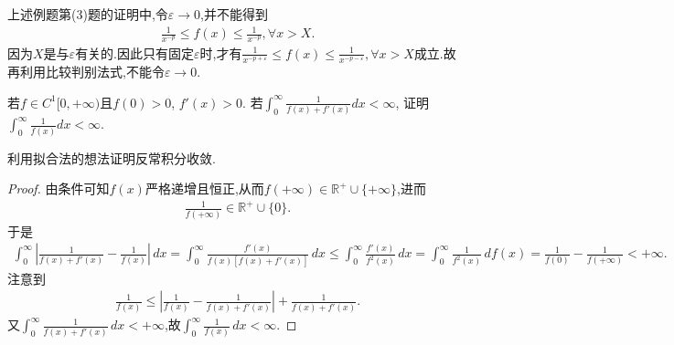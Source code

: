 \documentclass[../../main.tex]{subfiles}
\begin{document}
\begin{remark}
上述例题第(3)题的证明中,令$\varepsilon \to 0$,并不能得到
\begin{align*}
\frac{1}{x^{-p}}\leqslant f(x)\leqslant \frac{1}{x^{-p}},\forall x>X.
\end{align*}
因为$X$是与$\varepsilon$有关的.因此只有固定$\varepsilon$时,才有$\frac{1}{x^{-p+\varepsilon}}\leqslant f\left( x \right) \leqslant \frac{1}{x^{-p-\varepsilon}},\forall x>X$成立.故再利用比较判别法式,不能令$\varepsilon\to 0$.
\end{remark}

\begin{example}
若$f \in C^1[0, +\infty)$且$f(0) > 0$, $f'(x) > 0$. 若$\int_0^{\infty} \frac{1}{f(x) + f'(x)} dx < \infty$, 证明$\int_0^{\infty} \frac{1}{f(x)} dx < \infty$.
\end{example}
\begin{note}
利用拟合法的想法证明反常积分收敛.
\end{note}
\begin{proof}
由条件可知$f(x)$严格递增且恒正,从而$f(+\infty) \in \mathbb{R}^+ \cup \{+\infty\}$,进而
\begin{align*}
\frac{1}{f(+\infty)} \in \mathbb{R}^+ \cup \{0\}.
\end{align*}
于是
\begin{align*}
\int_0^{\infty} \left| \frac{1}{f(x) + f'(x)} - \frac{1}{f(x)} \right| \, dx = \int_0^{\infty} \frac{f'(x)}{f(x) \left[ f(x) + f'(x) \right]} \, dx \leqslant \int_0^{\infty} \frac{f'(x)}{f^2(x)} \, dx = \int_0^{\infty} \frac{1}{f^2(x)} \, df(x) = \frac{1}{f(0)} - \frac{1}{f(+\infty)} < +\infty.
\end{align*}
注意到
\begin{align*}
\frac{1}{f(x)} \leqslant \left| \frac{1}{f(x)} - \frac{1}{f(x) + f'(x)} \right| + \frac{1}{f(x) + f'(x)}.
\end{align*}
又$\int_0^{\infty} \frac{1}{f(x) + f'(x)} \, dx < +\infty$,故$\int_0^{\infty} \frac{1}{f(x)} \, dx < \infty$.
\end{proof}
\end{document}
